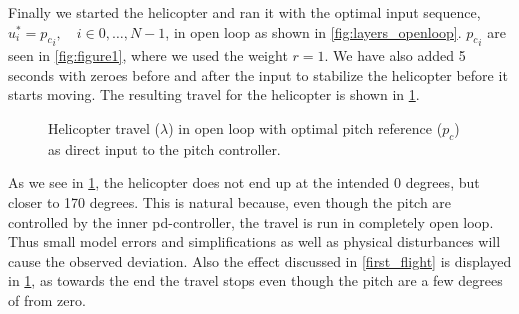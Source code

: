 Finally we started the helicopter and ran it with the optimal input sequence, $u^*_i ={p_c}_i, \quad i \in{0,\dots,N-1}$, in open loop as shown in \cref{fig:layers_openloop}. ${p_c}_i$ are seen in \cref{fig:figure1}, where we used the weight $r=1$. We have also added 5 seconds with zeroes before and after the input to stabilize the helicopter before it starts moving. The resulting travel for the helicopter is shown in \cref{fig:figure4}.
\begin{figure}[H]
        \centering
        \setlength{\figureheight}{6cm}
        \setlength{\figurewidth}{10cm}
        
        \caption{Helicopter travel ($\lambda$) in open loop with optimal pitch reference ($p_c$) as direct input to the pitch controller.}
\label{fig:figure4}
\end{figure}
\noindent
As we see in \cref{fig:figure4}, the helicopter does not end up at the intended $0$ degrees, but closer to 170 degrees. This is natural because, even though the pitch are controlled by the inner pd-controller, the travel is run in completely open loop. Thus small model errors and simplifications as well as physical disturbances will cause the observed deviation. Also the effect discussed in \cref{first_flight} is displayed in \cref{fig:figure4}, as towards the end the travel stops even though the pitch are a few degrees of from zero. 